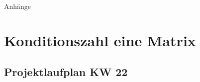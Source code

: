 %
%
%
%

\begin{appendix}

\newpage

\begin{center}
	\huge{Anhänge}
\end{center}

\normalsize

\section{Konditionszahl eine Matrix}
\label{seq:ConditionNumber}

\newpage
\begin{landscape}
	\section{Projektlaufplan KW 22}
	\label{sec:projectplan}
	\scalebox{.75}{
		
		}
\end{landscape}


\end{appendix}
